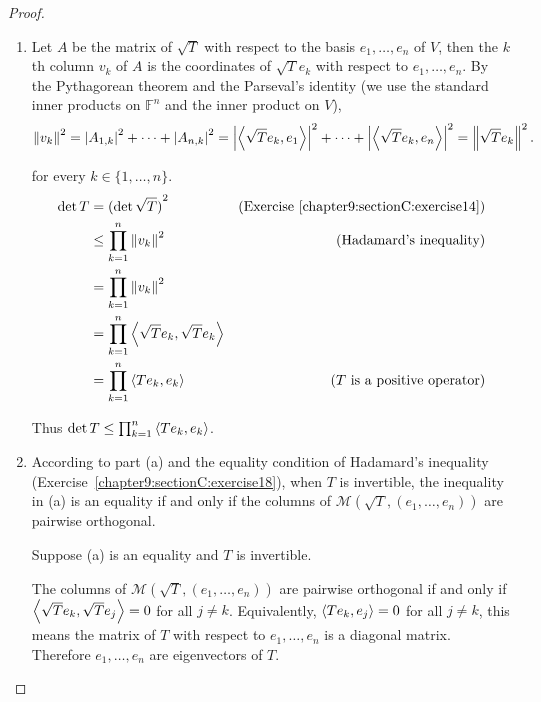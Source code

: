 \begin{proof}
    \begin{enumerate}[label={(\alph*)}]
        \item Let $A$ be the matrix of $\sqrt{T}$ with respect to the basis $e_{1}, \ldots, e_{n}$ of $V$, then the $k$th column $v_{k}$ of $A$ is the coordinates of $\sqrt{T}e_{k}$ with respect to $e_{1}, \ldots, e_{n}$. By the Pythagorean theorem and the Parseval's identity (we use the standard inner products on $\mathbb{F}^{n}$ and the inner product on $V$),
              \begin{align*}
                  \left\Vert{v_{k}}\right\Vert^{2} = \left\vert{A_{1,k}}\right\vert^{2} + \cdots + \left\vert{A_{n,k}}\right\vert^{2} = \left\vert{\left\langle{\sqrt{T}e_{k}, e_{1}}\right\rangle}\right\vert^{2} + \cdots +\left\vert{\left\langle{\sqrt{T}e_{k}, e_{n}}\right\rangle}\right\vert^{2} = \left\Vert{\sqrt{T}e_{k}}\right\Vert^{2}.
              \end{align*}

              for every $k\in\{1,\ldots,n\}$.
              \begin{align*}
                  \det T & = {(\det \sqrt{T})}^{2}                                   & \text{(Exercise~\ref{chapter9:sectionC:exercise14})} \\
                         & \leq \prod^{n}_{k=1}\left\Vert{v_{k}}\right\Vert^{2}                      & \text{(Hadamard's inequality)}                       \\
                         & = \prod^{n}_{k=1}\left\Vert{v_{k}}\right\Vert^{2}                                                                                \\
                         & = \prod^{n}_{k=1}\left\langle{\sqrt{T}e_{k}, \sqrt{T}e_{k}}\right\rangle                                                        \\
                         & = \prod^{n}_{k=1}\left\langle{Te_{k}, e_{k}}\right\rangle                & \text{($T$ is a positive operator)}
              \end{align*}

              Thus $\det T\leq \prod^{n}_{k=1}\left\langle{Te_{k}, e_{k}}\right\rangle$.
        \item According to part (a) and the equality condition of Hadamard's inequality (Exercise~\ref{chapter9:sectionC:exercise18}), when $T$ is invertible, the inequality in (a) is an equality if and only if the columns of $\mathcal{M}(\sqrt{T}, (e_{1}, \ldots, e_{n}))$ are pairwise orthogonal.


              Suppose (a) is an equality and $T$ is invertible.

              The columns of $\mathcal{M}(\sqrt{T}, (e_{1}, \ldots, e_{n}))$ are pairwise orthogonal if and only if $\left\langle{\sqrt{T}e_{k}, \sqrt{T}e_{j}}\right\rangle = 0$ for all $j\ne k$. Equivalently, $\left\langle{Te_{k}, e_{j}}\right\rangle = 0$ for all $j\ne k$, this means the matrix of $T$ with respect to $e_{1}, \ldots, e_{n}$ is a diagonal matrix. Therefore $e_{1}, \ldots, e_{n}$ are eigenvectors of $T$.


\end{enumerate}
\end{proof}
